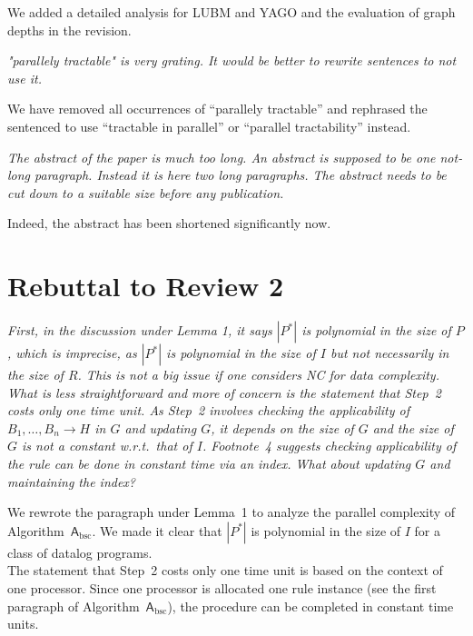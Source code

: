 \documentclass{article}
\let\quoteOld\quote
\let\endquoteOld\endquote
\renewenvironment{quote}{\quoteOld\itshape}{\endquoteOld}
\begin{document}
We added a detailed analysis for LUBM and YAGO and the evaluation of
graph depths in the revision.


\begin{quote}
"parallely tractable" is very grating.  It would be better to rewrite
sentences to not use it.
\end{quote}

We have removed all occurrences of ``parallely tractable'' and
rephrased the sentenced to use ``tractable in parallel'' or ``parallel
tractability'' instead.

\begin{quote}
The abstract of the paper is much too long.  An abstract is supposed to be
one not-long paragraph.  Instead it is here two long paragraphs.  The
abstract needs to be cut down to a suitable size before any publication.
\end{quote}

Indeed, the abstract has been shortened significantly now.


\section{Rebuttal to Review 2}

\begin{quote}
First, in the discussion under Lemma 1, it says $|P^*|$ is polynomial in the size of $P$, which is imprecise, as $|P^*|$ is polynomial in the size of $I$ but not necessarily in the size of $R$. This is not a big issue if one considers NC for data complexity. What is less straightforward and more of concern is the statement that Step~2 costs only one time unit. As Step~2 involves checking the applicability of $B_1, \ldots, B_n \to H$ in $G$ and updating $G$, it depends on the size of $G$ and the size of $G$ is not a constant w.r.t.\ that of $I$. Footnote~4 suggests checking applicability of the rule can be done in constant time via an index. What about updating $G$ and maintaining the index?
\end{quote}

We rewrote the paragraph under Lemma~1 to analyze the parallel complexity of Algorithm~$\mathsf{A}_{\text{bsc}}$.
We made it clear that $|P^*|$ is polynomial in the size of $I$ for a class of datalog programs.\\

The statement that Step~2 costs only one time unit is based on the context of one processor. Since one processor
is allocated one rule instance (see the first paragraph of Algorithm~$\mathsf{A}_{\text{bsc}}$),
the procedure can be completed in constant time units. \\
\end{document}
